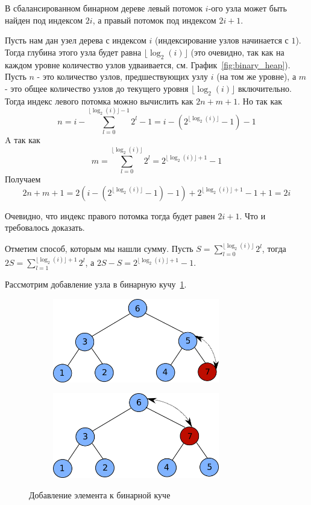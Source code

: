 \begin{theorem}
В сбалансированном бинарном дереве левый потомок $i$-ого узла может быть найден под 
индексом $2i$, а правый потомок под индексом $2i+1$.
\end{theorem}

Пусть нам дан узел дерева с индексом $i$ (индексирование узлов начинается с $1$). Тогда глубина этого узла 
будет равна $\lfloor \log_2(i) \rfloor$ (это очевидно, так как на каждом 
уровне количество узлов удваивается, см. График~\ref{fig:binary_heap}). Пусть $n$ - это количество узлов, 
предшествующих узлу $i$ (на том же уровне), а $m$ - это общее количество узлов
до текущего уровня $\lfloor \log_2(i) \rfloor$ включительно. Тогда индекс 
левого потомка можно вычислить как $2n + m+1$. Но так как
$$n = i - \sum_{l=0}^{\lfloor \log_2(i) \rfloor - 1} 2^l - 1 = i - (2^{\lfloor \log_2(i) \rfloor} - 1) - 1$$ 
A так как
$$m=\sum_{l=0}^{\lfloor \log_2(i) \rfloor} 2^l = 2^{\lfloor \log_2(i) \rfloor + 1} - 1$$
Получаем
$$2n+m+1= 2(i - (2^{\lfloor \log_2(i) \rfloor} - 1) - 1) + 2^{\lfloor \log_2(i) \rfloor + 1} - 1 + 1 = 2i$$ 

Очевидно, что индекс правого потомка тогда будет равен $2i+1$.
Что и требовалось доказать.

Отметим способ, которым мы нашли сумму. Пусть $S=\sum_{l=0}^{\lfloor \log_2(i) \rfloor} 2^l$, тогда 
$2S=\sum_{l=1}^{\lfloor \log_2(i) \rfloor + 1} 2^l$, а $2S-S = 2^{\lfloor \log_2(i) \rfloor + 1} - 1$.


Рассмотрим добавление узла в бинарную кучу~\ref{fig:binary_heap_insertion}.

\begin{figure}
\begin{subfigure}[t]{0.6\textwidth}
	\includegraphics[width=0.8\textwidth]{graphics/binary_heap_insert_1.png}
\end{subfigure}
\begin{subfigure}[t]{0.6\textwidth}
	\includegraphics[width=0.8\textwidth]{graphics/binary_heap_insert_2.png}
\end{subfigure}
\caption{Добавление элемента к бинарной куче}
\label{fig:binary_heap_insertion}
\end{figure}

